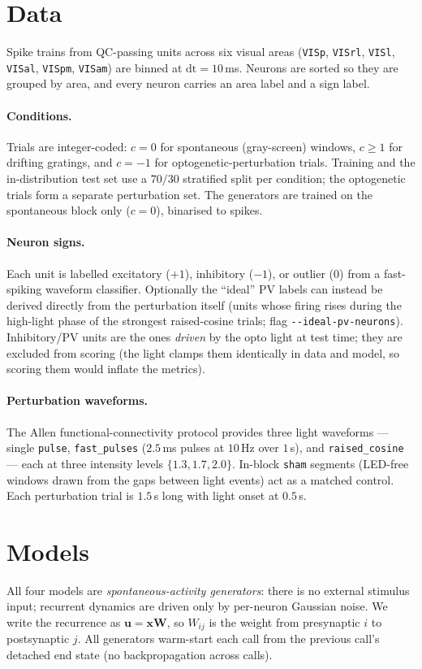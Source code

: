 \documentclass[11pt]{article}
\newcommand{\Wmat}{\mathbf{W}}
\newcommand{\xvec}{\mathbf{x}}
\newcommand{\code}[1]{\texttt{#1}}
\begin{document}
\section{Data}
\label{sec:data}
Spike trains from QC-passing units across six visual areas
(\code{VISp}, \code{VISrl}, \code{VISl}, \code{VISal}, \code{VISpm}, \code{VISam})
are binned at $\mathrm{dt} = 10$\,ms. Neurons are sorted so they are grouped by
area, and every neuron carries an area label and a sign label.

\paragraph{Conditions.} Trials are integer-coded: $c = 0$ for spontaneous
(gray-screen) windows, $c \geq 1$ for drifting gratings, and $c = -1$ for
optogenetic-perturbation trials. Training and the in-distribution test set use a
$70/30$ stratified split per condition; the optogenetic trials form a separate
perturbation set. The generators are trained on the spontaneous block only
($c=0$), binarised to spikes.

\paragraph{Neuron signs.} Each unit is labelled excitatory ($+1$), inhibitory
($-1$), or outlier ($0$) from a fast-spiking waveform classifier. Optionally the
``ideal'' PV labels can instead be derived directly from the perturbation
itself (units whose firing rises during the high-light phase of the strongest
raised-cosine trials; flag \code{-{}-ideal-pv-neurons}). Inhibitory/PV units are
the ones \emph{driven} by the opto light at test time; they are excluded from
scoring (the light clamps them identically in data and model, so scoring them
would inflate the metrics).

\paragraph{Perturbation waveforms.} The Allen functional-connectivity protocol
provides three light waveforms --- single \code{pulse}, \code{fast\_pulses}
($2.5$\,ms pulses at $10$\,Hz over $1$\,s), and \code{raised\_cosine} --- each at
three intensity levels $\{1.3, 1.7, 2.0\}$. In-block \code{sham} segments
(LED-free windows drawn from the gaps between light events) act as a matched
control. Each perturbation trial is $1.5$\,s long with light onset at $0.5$\,s.

\section{Models}
\label{sec:models}
All four models are \emph{spontaneous-activity generators}: there is no external
stimulus input; recurrent dynamics are driven only by per-neuron Gaussian noise.
We write the recurrence as $\mathbf{u} = \xvec\Wmat$, so $W_{ij}$ is the weight
from presynaptic $i$ to postsynaptic $j$. All generators warm-start each call
from the previous call's detached end state (no backpropagation across calls).
\end{document}
